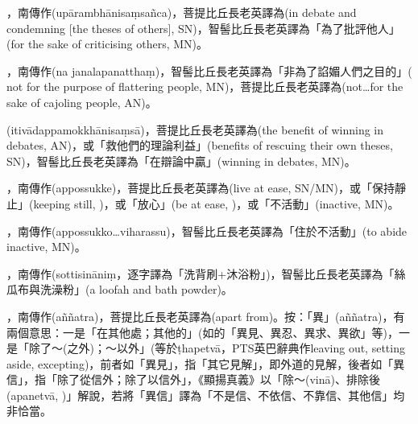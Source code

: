 \startitemgroup[noteitems]
\item{}，南傳作(upārambhānisaṃsañca)，菩提比丘長老英譯為(in debate and condemning [the theses of others], SN)，智髻比丘長老英譯為「為了批評他人」(for the sake of criticising others, MN)。
\stopitemgroup

\startitemgroup[noteitems]
\item{}，南傳作(na janalapanatthaṃ)，智髻比丘長老英譯為「非為了諂媚人們之目的」( not for the purpose of flattering people, MN)，菩提比丘長老英譯為(not…for the sake of cajoling people, AN)。
\stopitemgroup

\startitemgroup[noteitems]
\item{}(itivādappamokkhānisaṃsā)，菩提比丘長老英譯為(the benefit of winning in debates, AN)，或「救他們的理論利益」(benefits of rescuing their own theses, SN)，智髻比丘長老英譯為「在辯論中贏」(winning in debates, MN)。
\stopitemgroup

\startitemgroup[noteitems]
\item{}，南傳作(appossukke)，菩提比丘長老英譯為(live at ease, SN/MN)，或「保持靜止」(keeping still, )，或「放心」(be at ease, )，或「不活動」(inactive, MN)。
\item{}，南傳作(appossukko…viharassu)，智髻比丘長老英譯為「住於不活動」(to abide inactive, MN)。
\stopitemgroup

\startitemgroup[noteitems]
\item{}，南傳作(sottisināniṃ，逐字譯為「洗背刷+沐浴粉」)，智髻比丘長老英譯為「絲瓜布與洗澡粉」(a loofah and bath powder)。
\stopitemgroup

\startitemgroup[noteitems]
\item{}，南傳作(aññatra)，菩提比丘長老英譯為(apart from)。按：「異」(aññatra)，有兩個意思：一是「在其他處；其他的」(如的「異見、異忍、異求、異欲」等)，一是「除了～(之外)；～以外」(等於ṭhapetvā，PTS英巴辭典作leaving out, setting aside, excepting)，前者如「異見」，指「其它見解」，即外道的見解，後者如「異信」，指「除了從信外；除了以信外」，《顯揚真義》以「除～(vinā)、排除後(apanetvā, )」解說，若將「異信」譯為「不是信、不依信、不靠信、其他信」均非恰當。
\stopitemgroup

